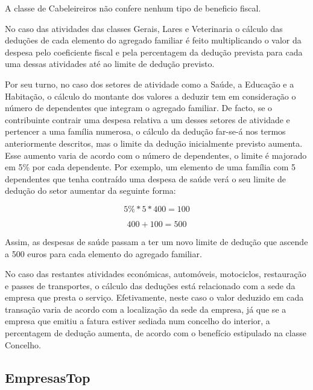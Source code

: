 \documentclass[a4paper]{article}
\begin{document}
A classe de Cabeleireiros não confere nenhum tipo de beneficio fiscal. \par


No caso das atividades das classes Gerais, Lares e Veterinaria o cálculo das deduções
de cada elemento do agregado familiar é feito multiplicando o valor da despesa pelo
coeficiente fiscal e pela percentagem da dedução prevista para cada uma dessas atividades
até ao limite de dedução previsto. \par


Por seu turno, no caso dos setores de atividade como a Saúde, a Educação e a
Habitação, o cálculo do montante dos valores a deduzir tem em consideração o número
de dependentes que integram o agregado familiar. De facto, se o contribuinte contrair uma
despesa relativa a um desses setores de atividade e pertencer a uma família numerosa, o
cálculo da dedução far-se-á nos termos anteriormente descritos, mas o limite
da dedução inicialmente previsto aumenta. Esse aumento varia de acordo com o número de
dependentes, o limite é majorado em 5\% por cada dependente. Por exemplo, um
elemento de uma família com 5 dependentes que tenha contraído uma despesa de saúde
verá o seu limite de dedução do setor aumentar da seguinte forma:

\begin{equation} 5\% * 5 * 400 = 100 \end{equation}


 \begin{equation} 400 + 100 = 500 \end{equation}

Assim, as despesas de saúde passam a ter um novo limite de dedução que ascende a 500 euros
para cada elemento do agregado familiar.


No caso das restantes atividades económicas, automóveis, motociclos, restauração
e passes de transportes, o cálculo das deduções está relacionado com a sede da
empresa que presta o serviço. Efetivamente, neste caso o valor deduzido em cada
transação varia de acordo com a localização da sede da empresa, já que se a
empresa que emitiu a fatura estiver sediada num concelho do interior, a percentagem
de dedução aumenta, de acordo com o benefício estipulado na classe Concelho.



\subsection{EmpresasTop}
\label{sec:empresastop}
\end{document}
